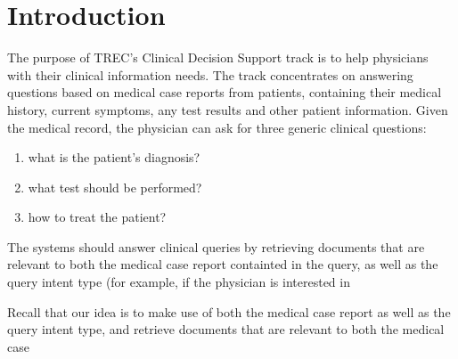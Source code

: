 \chapter{Introduction}
\cite{bringhurst1996ets}

The purpose of TREC's Clinical Decision Support track is to help physicians with their clinical information needs. The track concentrates
on answering questions based on medical case reports from patients, containing their medical history, current symptoms, any test results and other
patient information.
Given the medical record, the physician can ask for three generic clinical questions: 
\begin{enumerate}[label=\arabic*)]
 \item what is the patient's diagnosis?
 \item what test should be performed?
 \item how to treat the patient?
\end{enumerate}

The systems should answer clinical queries by retrieving documents that are relevant to both the medical case report
containted in the query, as well as the query intent type (for example, if the physician is interested in 

Recall that our idea is to make use of both the medical case report as well as the query intent type, and retrieve documents
that are relevant to both the medical case 



